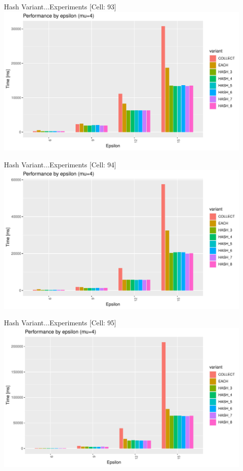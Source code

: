 \documentclass{beamer}
\begin{document}
\begin{frame}{Hash Variant...}{Experiments [Cell: 93]}
    \centering
    \includegraphics[width=0.95\textwidth]{figures/C_93E_15_M4} 
\end{frame}
\begin{frame}{Hash Variant...}{Experiments [Cell: 94]}
    \centering
    \includegraphics[width=0.95\textwidth]{figures/C_94E_15_M4} 
\end{frame}
\begin{frame}{Hash Variant...}{Experiments [Cell: 95]}
    \centering
    \includegraphics[width=0.95\textwidth]{figures/C_95E_15_M4} 
\end{frame}
\end{document}
